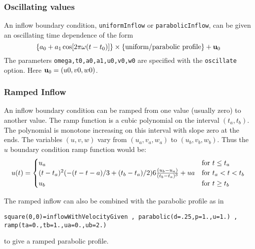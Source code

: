 \subsubsection{Oscillating values} \label{sec:oscillate}

An inflow boundary condition, {\tt uniformInflow} or {\tt parabolicInflow}, 
can be given an oscillating time dependence of the form
\[
   \{ a_0 + a_1 \cos[ 2 \pi \omega (t-t_0) ] \} \times \{ \mbox{uniform/parabolic profile} \} + \mathbf{ u}_0
\]
The parameters {\tt omega,t0,a0,a1,u0,v0,w0} are specified with the {\tt oscillate} option. Here
$\mathbf{ u}_0=(u0,v0,w0)$.


\subsubsection{Ramped Inflow} \label{sec:rampedInflow}

An inflow boundary condition can be ramped from one value (usually zero) to another value.
The ramp function is a cubic polynomial on the interval $(t_a,t_b)$. The polynomial is
monotone increasing on this interval with slope zero at the ends.
 The variables $(u,v,w)$ vary from $(u_a,v_a,w_a)$ to $(u_b,v_b,w_b)$. Thus the $u$ boundary
condition ramp function would be:
\[
     u(t) = \begin{cases} 
             u_a  & \text{for $t\le t_a$} \\
            (t-t_a)^2( -(t-t-a)/3+(t_b-t_a)/2 ) 6 {(u_b-u_a) \over (t_b-t_a)^3}  +ua  & \text{for $t_a<t<t_b$} \\
            u_b & \text{for $t\ge t_b$}
            \end{cases}
\]

The ramped inflow can also be combined with the parabolic profile as in 
\begin{verbatim}
square(0,0)=inflowWithVelocityGiven , parabolic(d=.25,p=1.,u=1.) , ramp(ta=0.,tb=1.,ua=0.,ub=2.)
\end{verbatim}
to give a ramped parabolic profile.
